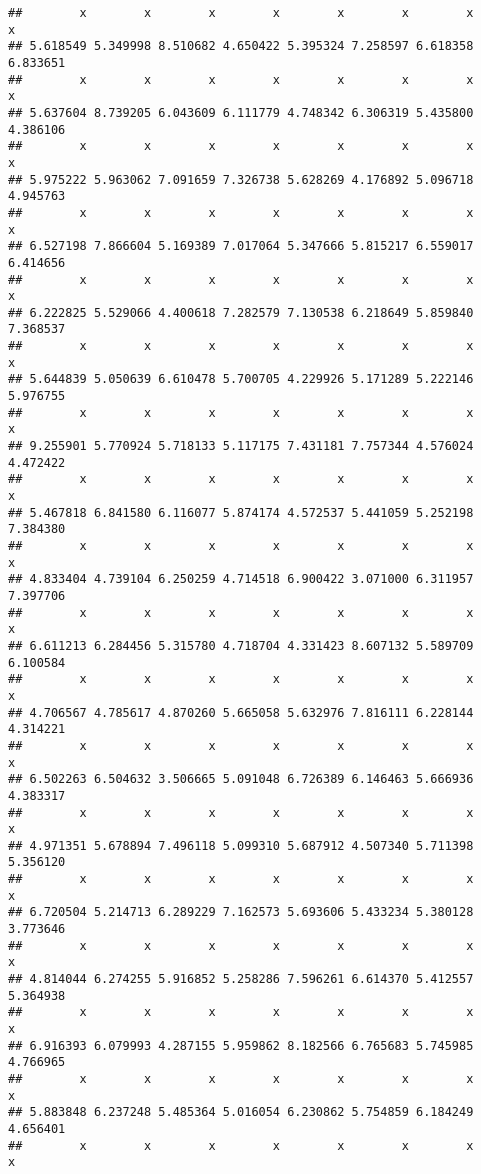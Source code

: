 \documentclass[a4paper,10pt]{book}\usepackage[]{graphicx}\usepackage[]{color}
\makeatletter
\newenvironment{kframe}{%
 \def\at@end@of@kframe{}%
 \ifinner\ifhmode%
  \def\at@end@of@kframe{\end{minipage}}%
  \begin{minipage}{\columnwidth}%
 \fi\fi%
 \def\FrameCommand##1{\hskip\@totalleftmargin \hskip-\fboxsep
 \colorbox{shadecolor}{##1}\hskip-\fboxsep
     \hskip-\linewidth \hskip-\@totalleftmargin \hskip\columnwidth}%
 \MakeFramed {\advance\hsize-\width
   \@totalleftmargin\z@ \linewidth\hsize
   \@setminipage}}%
 {\par\unskip\endMakeFramed%
 \at@end@of@kframe}
\newenvironment{knitrout}{}{} %
\makeatother
\begin{document}
\begin{knitrout}
\begin{kframe}
\begin{verbatim}
##        x        x        x        x        x        x        x        x 
## 5.618549 5.349998 8.510682 4.650422 5.395324 7.258597 6.618358 6.833651 
##        x        x        x        x        x        x        x        x 
## 5.637604 8.739205 6.043609 6.111779 4.748342 6.306319 5.435800 4.386106 
##        x        x        x        x        x        x        x        x 
## 5.975222 5.963062 7.091659 7.326738 5.628269 4.176892 5.096718 4.945763 
##        x        x        x        x        x        x        x        x 
## 6.527198 7.866604 5.169389 7.017064 5.347666 5.815217 6.559017 6.414656 
##        x        x        x        x        x        x        x        x 
## 6.222825 5.529066 4.400618 7.282579 7.130538 6.218649 5.859840 7.368537 
##        x        x        x        x        x        x        x        x 
## 5.644839 5.050639 6.610478 5.700705 4.229926 5.171289 5.222146 5.976755 
##        x        x        x        x        x        x        x        x 
## 9.255901 5.770924 5.718133 5.117175 7.431181 7.757344 4.576024 4.472422 
##        x        x        x        x        x        x        x        x 
## 5.467818 6.841580 6.116077 5.874174 4.572537 5.441059 5.252198 7.384380 
##        x        x        x        x        x        x        x        x 
## 4.833404 4.739104 6.250259 4.714518 6.900422 3.071000 6.311957 7.397706 
##        x        x        x        x        x        x        x        x 
## 6.611213 6.284456 5.315780 4.718704 4.331423 8.607132 5.589709 6.100584 
##        x        x        x        x        x        x        x        x 
## 4.706567 4.785617 4.870260 5.665058 5.632976 7.816111 6.228144 4.314221 
##        x        x        x        x        x        x        x        x 
## 6.502263 6.504632 3.506665 5.091048 6.726389 6.146463 5.666936 4.383317 
##        x        x        x        x        x        x        x        x 
## 4.971351 5.678894 7.496118 5.099310 5.687912 4.507340 5.711398 5.356120 
##        x        x        x        x        x        x        x        x 
## 6.720504 5.214713 6.289229 7.162573 5.693606 5.433234 5.380128 3.773646 
##        x        x        x        x        x        x        x        x 
## 4.814044 6.274255 5.916852 5.258286 7.596261 6.614370 5.412557 5.364938 
##        x        x        x        x        x        x        x        x 
## 6.916393 6.079993 4.287155 5.959862 8.182566 6.765683 5.745985 4.766965 
##        x        x        x        x        x        x        x        x 
## 5.883848 6.237248 5.485364 5.016054 6.230862 5.754859 6.184249 4.656401 
##        x        x        x        x        x        x        x        x 

\end{verbatim}
\end{kframe}
\end{knitrout}
\end{document}
